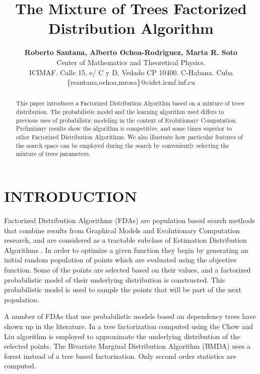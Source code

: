 \documentclass[10pt,thmsa]{article}
\begin{document}
\title{The Mixture of Trees Factorized Distribution Algorithm}
\author{\textbf{Roberto Santana, Alberto Ochoa-Rodriguez, Marta R. Soto} \\
Center of Mathematics and Theoretical Physics. \\
ICIMAF. Calle 15, e/ C y D, Vedado CP 10400. C-Habana. Cuba\\
\{rsantana,ochoa,mrosa\}@cidet.icmf.inf.cu}
\maketitle

\begin{abstract}
This paper introduces a Factorized Distribution Algorithm based on a mixture
of trees distribution. The probabilistic model and the learning algorithm
used differs to previous uses of probabilistic modeling in the context of
Evolutionary Computation. Preliminary results show the algorithm is
competitive, and some times superior to other Factorized Distribution
Algorithms. We also illustrate how particular features of the search space
can be employed during the search by conveniently selecting the mixture of
trees parameters.
\end{abstract}

\medskip \medskip \medskip \medskip

\section{INTRODUCTION}

Factorized Distribution Algorithms (FDAs) \citep{Muhlenbein_et_al:1999} are
population based search methods that combine results from Graphical Models
and Evolutionary Computation research, and are considered as a tractable
subclass of Estimation Distribution Algorithms \citep{Muhlenbein:1996}. In
order to optimize a given function they begin by generating an initial
random population of points which are evaluated using the objective
function. Some of the points are selected based on their values, and a
factorized probabilistic model of their underlying distribution is
constructed. This probabilistic model is used to sample the points that will
be part of the next population.

A number of FDAs that use probabilistic models based on dependency trees
have shown up in the literature. In \citep{Baluja_and_Davies:1997} a tree
factorization computed using the Chow and Liu algorithm %
\citep{Chow_and_Liu:1968} is employed to approximate the underlying
distribution of the selected points. The Bivariate Marginal Distribution
Algorithm (BMDA) \citep{Pelikan_and_Muehlenbein:1999} uses a forest instead
of a tree based factorization. Only second order statistics are computed.
\end{document}
